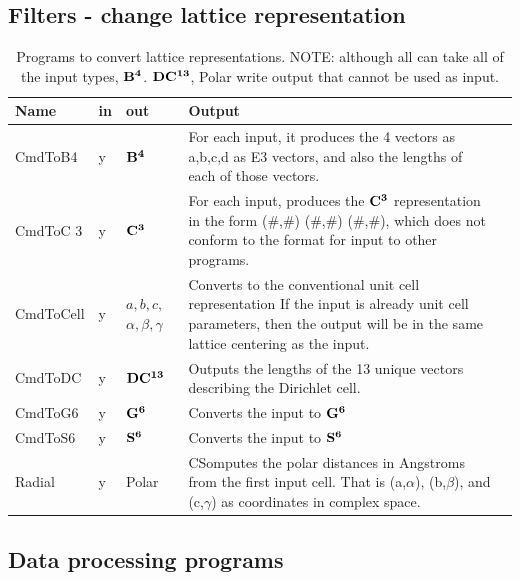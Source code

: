 \documentclass[preprint]{iucr}              %
\numberwithin{equation}{section}
\newcommand{\BIV}[0]{$\bf{B^{4}}$}
\newcommand{\SVI}[0]{$\bf{S^{6}}$}
\newcommand{\GVI}[0]{$\bf{G^{6}}$}
\newcommand{\CIII}[0]{$\bf{C^{3}}$}
\newcommand{\DXIII}[0]{$\bf{DC^{13}}$}
\begin{document}
	\subsection{Filters - change lattice representation}
	
	\begin{table}
		\renewcommand{\arraystretch}{1.2}
		\caption{Programs to convert lattice representations.
		NOTE: although all can take all of the input types, \BIV{}. \DXIII{}, 
	Polar write output that cannot be used as input.}
		\begin{tabular}{l l l p{}  l}
			\toprule
			Name		&	in	&	out			& Output	\\
			\midrule
			CmdToB4		&	y	&	\BIV{}		&		For each input, 
			it produces the 4 vectors as a,b,c,d as E3 vectors, 
			and also the lengths of each of those vectors.\\[.9pt]
			CmdToC	3	&	y	&	\CIII{	}	&		
			For each input, produces the \CIII{} representation in the form 
			(\#,\#) (\#,\#) (\#,\#), 
			which does not conform to the format for input to other programs.\\[.9pt]
			CmdToCell	&	y	&	
			\parbox[t]{0.07\textwidth}{${	a,b,c,}$ \\ ${\alpha,\beta,\gamma}$}	&					Converts to the conventional unit cell representation
			If the input is already unit cell parameters, then the output
			will be in the same lattice centering as the input.\\[.9pt]
			CmdToDC		&	y	&	\DXIII{}		&	Outputs the lengths of the 13 unique vectors describing the Dirichlet cell.\\[.9pt]			
			CmdToG6		&	y	&	\GVI{}		&		Converts the input to \GVI{}\\[.9pt]
			CmdToS6		&	y	&	\SVI{}		&		Converts the input to \SVI{}\\[.9pt]
			Radial		&	y	&	Polar	&
				CSomputes the polar distances in Angstroms 
				from the first input cell. 
				That is {(a,$\alpha$)}, {(b,$\beta$)}, and {(c,$\gamma$)} 
				as coordinates in complex space.\\[.9pt]
			\bottomrule
			
		\end{tabular}
	\end{table}

\subsection{Data processing programs}
\end{document}
